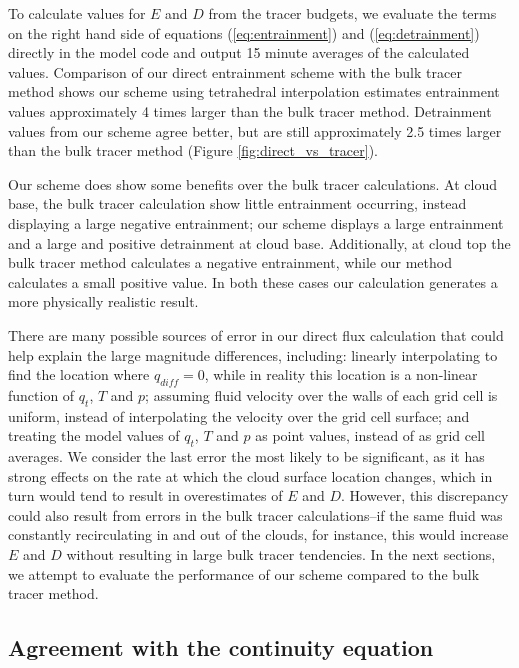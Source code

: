 \documentclass[12pt]{article}
\begin{document}
To calculate values for $E$ and $D$ from the tracer budgets, we evaluate the 
terms on the right hand side of equations (\ref{eq:entrainment}) and 
(\ref{eq:detrainment}) directly in the model code and output 15 minute averages 
of the calculated values.  Comparison of our direct entrainment scheme with the 
bulk tracer method shows our scheme using tetrahedral interpolation estimates
entrainment values approximately 4 times larger than the bulk tracer method.
Detrainment values from our scheme agree better, but are still approximately 
2.5 times larger than the bulk tracer method (Figure 
\ref{fig:direct_vs_tracer}).

Our scheme does show some benefits over the bulk tracer calculations.  At 
cloud base, the bulk tracer calculation show little entrainment occurring, 
instead displaying a large negative entrainment; our scheme displays a large 
entrainment and a large and positive detrainment at cloud base.  Additionally, 
at cloud top the bulk tracer method calculates a negative entrainment, 
while our method calculates a small positive value.  In both these cases our 
calculation generates a more physically realistic result.

There are many possible sources of error in our direct flux calculation that 
could help explain the large magnitude differences, including: linearly
interpolating to find the location where $q_{diff} = 0$, while in reality this
location is a non-linear function of $q_t$, $T$ and $p$; assuming fluid velocity
over the walls of each grid cell is uniform, instead of interpolating the 
velocity over the grid cell surface; and treating the model values of $q_t$, 
$T$ and $p$ as point values, instead of as grid cell averages.  We consider the
last error the most likely to be significant, as it has strong effects on the 
rate at which the cloud surface location changes, which in turn would tend to 
result in overestimates of $E$ and $D$.  However, this discrepancy could also
result from errors in the bulk tracer calculations--if the same fluid was 
constantly recirculating in and out of the clouds, for instance, this would 
increase $E$ and $D$ without resulting in large bulk tracer tendencies.  In the
next sections, we attempt to evaluate the performance of our scheme compared to 
the bulk tracer method.


\subsection{Agreement with the continuity equation}
\end{document}
